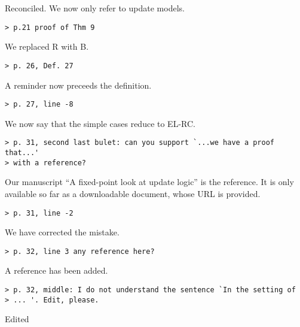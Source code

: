 \documentclass{article}
\begin{document}
Reconciled. We now only refer to update models.

\begin{verbatim} 
> p.21 proof of Thm 9
\end{verbatim}

We replaced R with B.

\begin{verbatim} 
> p. 26, Def. 27
\end{verbatim}

A reminder now preceeds the definition.

\begin{verbatim} 
> p. 27, line -8
\end{verbatim}

We now say that the simple cases reduce to EL-RC.

\begin{verbatim} 
> p. 31, second last bulet: can you support `...we have a proof that...'
> with a reference?
\end{verbatim}

Our manuscript ``A fixed-point look at update logic'' is the reference. It
is only available so far as a downloadable document, whose URL is provided.

\begin{verbatim} 
> p. 31, line -2
\end{verbatim}

We have corrected the mistake.

\begin{verbatim} 
> p. 32, line 3 any reference here?
\end{verbatim}

A reference has been added.

\begin{verbatim} 
> p. 32, middle: I do not understand the sentence `In the setting of
> ... '. Edit, please.
\end{verbatim}

Edited
\end{document}
